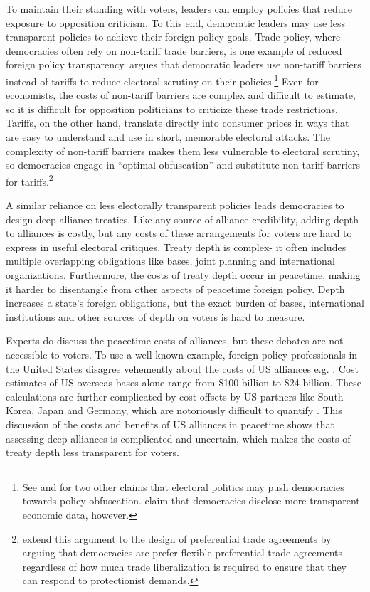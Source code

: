 \documentclass[12pt]{article}
\begin{document}
To maintain their standing with voters, leaders can employ policies that reduce exposure to opposition criticism.
To this end, democratic leaders may use less transparent policies to achieve their foreign policy goals.  
Trade policy, where democracies often rely on non-tariff trade barriers, is one example of reduced foreign policy transparency.
\citet{Kono2006} argues that democratic leaders use non-tariff barriers instead of tariffs to reduce electoral scrutiny on their policies.\footnote{See \citet{Rejali2007} and \citet{Stasavage2004} for two other claims that electoral politics may push democracies towards policy obfuscation. \citet{Hollyeretal2011} claim that democracies disclose more transparent economic data, however.}
Even for economists, the costs of non-tariff barriers are complex and difficult to estimate, so it is difficult for opposition politicians to criticize these trade restrictions. 
Tariffs, on the other hand, translate directly into consumer prices in ways that are easy to understand and use in short, memorable electoral attacks.
The complexity of non-tariff barriers makes them less vulnerable to electoral scrutiny, so democracies engage in ``optimal obfuscation'' and substitute non-tariff barriers for tariffs.\footnote{\citet{Baccinietal2015} extend this argument to the design of preferential trade agreements by arguing that democracies are prefer flexible preferential trade agreements regardless of how much trade liberalization is required to ensure that they can respond to protectionist demands.}  


A similar reliance on less electorally transparent policies leads democracies to design deep alliance treaties. 
Like any source of alliance credibility, adding depth to alliances is costly, but any costs of these arrangements for voters are hard to express in useful electoral critiques.
Treaty depth is complex- it often includes multiple overlapping obligations like bases, joint planning and international organizations.
Furthermore, the costs of treaty depth occur in peacetime, making it harder to disentangle from other aspects of peacetime foreign policy. 
Depth increases a state's foreign obligations, but the exact burden of bases, international institutions and other sources of depth on voters is hard to measure. 


Experts do discuss the peacetime costs of alliances, but these debates are not accessible to voters. 
To use a well-known example, foreign policy professionals in the United States disagree vehemently about the costs of US alliances e.g. \citep{Brooksetal2013, Posen2014, BrandsFeaver2017}.
Cost estimates of US overseas bases alone range from \$100 billion \citep{Vine2015} to \$24 billion. 
These calculations are further complicated by cost offsets by US partners like South Korea, Japan and Germany, which are notoriously difficult to quantify \citep{Lostumboetal2013}.  
This discussion of the costs and benefits of US alliances in peacetime shows that assessing deep alliances is complicated and uncertain, which makes the costs of treaty depth less transparent for voters. 
\end{document}
